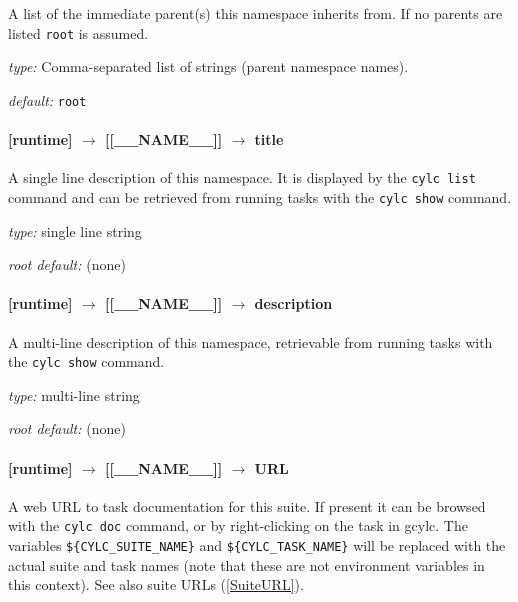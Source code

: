 A list of the immediate parent(s) this namespace inherits from. If no
parents are listed \lstinline=root= is assumed.

\begin{myitemize}
\item {\em type:} Comma-separated list of strings (parent namespace names).
\item {\em default:} \lstinline=root=
\end{myitemize}

\paragraph[title]{[runtime] $\rightarrow$ [[\_\_NAME\_\_]] $\rightarrow$ title}

A single line description of this namespace. It is displayed by the
\lstinline=cylc list= command and can be retrieved from running tasks
with the \lstinline=cylc show= command.

\begin{myitemize}
\item {\em type:} single line string
\item {\em root default:} (none)
\end{myitemize}

\paragraph[description]{[runtime] $\rightarrow$ [[\_\_NAME\_\_]] $\rightarrow$ description}

A multi-line description of this namespace, retrievable from running tasks with the
\lstinline=cylc show= command.

\begin{myitemize}
\item {\em type:} multi-line string
\item {\em root default:} (none)
\end{myitemize}

\paragraph[URL]{[runtime] $\rightarrow$ [[\_\_NAME\_\_]] $\rightarrow$ URL}
\label{TaskURL}

A web URL to task documentation for this suite.  If present it can be browsed
with the \lstinline=cylc doc= command, or by right-clicking on the task in
gcylc.  The variables \lstinline=${CYLC_SUITE_NAME}= and
\lstinline=${CYLC_TASK_NAME}= will be replaced with the actual suite and task
names (note that these are not environment variables in this context). See also
suite URLs (\ref{SuiteURL}).

